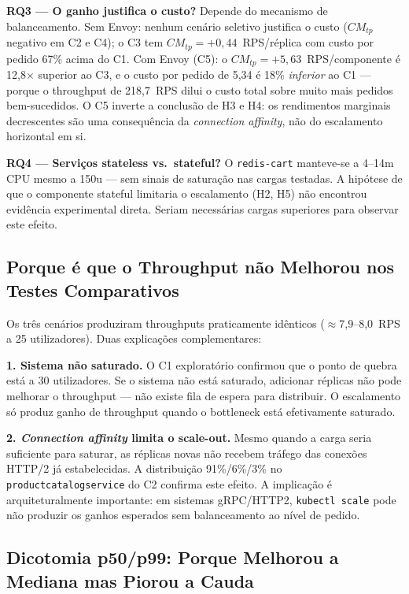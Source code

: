 \documentclass[manuscript,screen,review]{acmart}
\begin{document}
\textbf{RQ3 — O ganho justifica o custo?} Depende do mecanismo de balanceamento. Sem Envoy: nenhum cenário seletivo justifica o custo ($CM_{tp}$ negativo em C2 e C4); o C3 tem $CM_{tp}=+0{,}44$~RPS/réplica com custo por pedido 67\% acima do C1. Com Envoy (C5): o $CM_{tp}=+5{,}63$~RPS/componente é 12,8× superior ao C3, e o custo por pedido de 5,34 é 18\% \emph{inferior} ao C1 — porque o throughput de 218,7~RPS dilui o custo total sobre muito mais pedidos bem-sucedidos. O C5 inverte a conclusão de H3 e H4: os rendimentos marginais decrescentes são uma consequência da \textit{connection affinity}, não do escalamento horizontal em si.

\textbf{RQ4 — Serviços stateless vs.\ stateful?} O \texttt{redis-cart} manteve-se a 4--14m CPU mesmo a 150u — sem sinais de saturação nas cargas testadas. A hipótese de que o componente stateful limitaria o escalamento (H2, H5) não encontrou evidência experimental direta. Seriam necessárias cargas superiores para observar este efeito.

\subsection{Porque é que o Throughput não Melhorou nos Testes Comparativos}

Os três cenários produziram throughputs praticamente idênticos ($\approx$7{,}9--8{,}0~RPS a 25 utilizadores). Duas explicações complementares:

\textbf{1. Sistema não saturado.} O C1 exploratório confirmou que o ponto de quebra está a 30 utilizadores. Se o sistema não está saturado, adicionar réplicas não pode melhorar o throughput — não existe fila de espera para distribuir. O escalamento só produz ganho de throughput quando o bottleneck está efetivamente saturado.

\textbf{2. \textit{Connection affinity} limita o scale-out.} Mesmo quando a carga seria suficiente para saturar, as réplicas novas não recebem tráfego das conexões HTTP/2 já estabelecidas. A distribuição 91\%/6\%/3\% no \texttt{productcatalogservice} do C2 confirma este efeito. A implicação é arquiteturalmente importante: em sistemas gRPC/HTTP2, \texttt{kubectl scale} pode não produzir os ganhos esperados sem balanceamento ao nível de pedido.

\subsection{Dicotomia p50/p99: Porque Melhorou a Mediana mas Piorou a Cauda}
\end{document}
